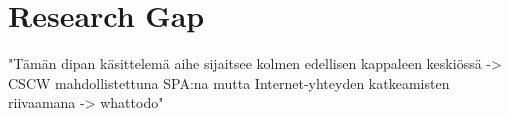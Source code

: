 \section{Research Gap}

"Tämän dipan käsittelemä aihe sijaitsee kolmen edellisen kappaleen keskiössä -> CSCW mahdollistettuna SPA:na mutta Internet-yhteyden katkeamisten riivaamana -> whattodo"
